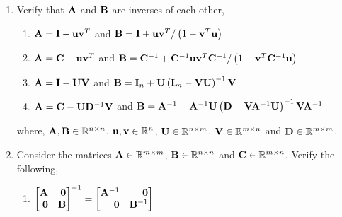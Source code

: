 \documentclass[9pt]{article}
\def\mf{\ensuremath\mathbf}
\def\mb{\ensuremath\mathbb}
\def\lp{\ensuremath\left(}
\def\rp{\ensuremath\right)}
\def\bmx{\ensuremath\begin{bmatrix*}[r]}
\def\emx{\ensuremath\end{bmatrix*}}
\begin{document}
\begin{multicols}{2}
\begin{enumerate}
    \item Verify that $\mf{A}$ and $\mf{B}$ are inverses of each other,
    \begin{enumerate}
        \item $\mf{A} = \mf{I} - \mf{u}\mf{v}^T$ and $\mf{B} = \mf{I} + \mf{u}\mf{v}^T / \lp 1 - \mf{v}^T\mf{u} \rp$
        \item $\mf{A} = \mf{C} - \mf{u}\mf{v}^T$ and $\mf{B} = \mf{C}^{-1} + \mf{C}^{-1}\mf{u}\mf{v}^T\mf{C}^{-1} / \lp 1 - \mf{v}^T\mf{C}^{-1}\mf{u} \rp$
        \item $\mf{A} = \mf{I} - \mf{U}\mf{V}$ and $\mf{B} = \mf{I}_{n} + \mf{U}\lp \mf{I}_m - \mf{V}\mf{U}\rp^{-1}\mf{V}$
        \item $\mf{A} = \mf{C} - \mf{U}\mf{D}^{-1}\mf{V}$ and $\mf{B} = \mf{A}^{-1} + \mf{A}^{-1}\mf{U}\lp \mf{D} - \mf{V}\mf{A}^{-1}\mf{U}\rp^{-1}\mf{V}\mf{A}^{-1}$
    \end{enumerate}
    where, $\mf{A}, \mf{B} \in \mb{R}^{n \times n}$, $\mf{u}, \mf{v} \in \mb{R}^n$, $\mf{U} \in \mb{R}^{n \times m}$, $\mf{V} \in \mb{R}^{m \times n}$ and $\mf{D} \in \mb{R}^{m \times m}$.

    \item Consider the matrices $\mf{A} \in \mb{R}^{m \times m}$, $\mf{B} \in \mb{R}^{n \times n}$ and $\mf{C} \in \mb{R}^{m \times n}$. Verify the following,
    \begin{enumerate}
        \item $\bmx \mf{A} & \mf{0} \\ \mf{0} & \mf{B}\emx^{-1} = \bmx \mf{A}^{-1} & \mf{0} \\ \mf{0} & \mf{B}^{-1}\emx$
    \end{enumerate}
    


\end{enumerate}
\end{multicols}
\end{document}
